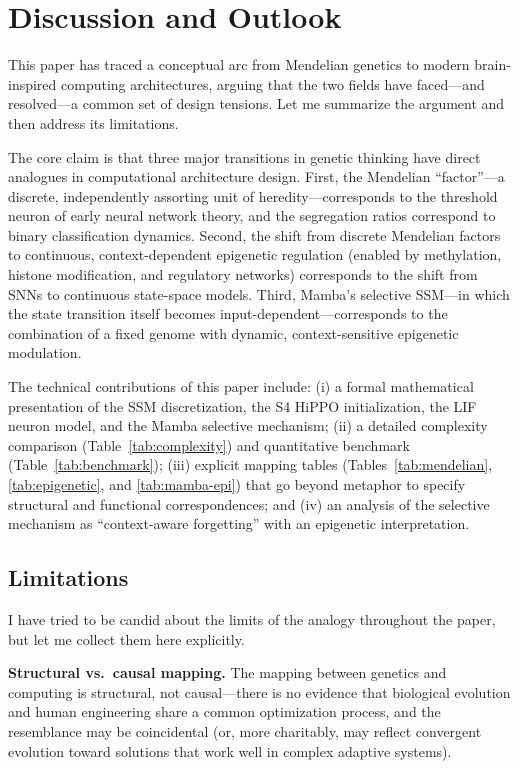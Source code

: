 \documentclass[12pt,a4paper]{article}
\begin{document}
\section{Discussion and Outlook}
\label{sec:discussion}

This paper has traced a conceptual arc from Mendelian genetics to modern brain-inspired computing architectures, arguing that the two fields have faced---and resolved---a common set of design tensions. Let me summarize the argument and then address its limitations.

The core claim is that three major transitions in genetic thinking have direct analogues in computational architecture design. First, the Mendelian ``factor''---a discrete, independently assorting unit of heredity---corresponds to the threshold neuron of early neural network theory, and the segregation ratios correspond to binary classification dynamics. Second, the shift from discrete Mendelian factors to continuous, context-dependent epigenetic regulation (enabled by methylation, histone modification, and regulatory networks) corresponds to the shift from SNNs to continuous state-space models. Third, Mamba's selective SSM---in which the state transition itself becomes input-dependent---corresponds to the combination of a fixed genome with dynamic, context-sensitive epigenetic modulation.

The technical contributions of this paper include: (i) a formal mathematical presentation of the SSM discretization, the S4 HiPPO initialization, the LIF neuron model, and the Mamba selective mechanism; (ii) a detailed complexity comparison (Table~\ref{tab:complexity}) and quantitative benchmark (Table~\ref{tab:benchmark}); (iii) explicit mapping tables (Tables~\ref{tab:mendelian}, \ref{tab:epigenetic}, and \ref{tab:mamba-epi}) that go beyond metaphor to specify structural and functional correspondences; and (iv) an analysis of the selective mechanism as ``context-aware forgetting'' with an epigenetic interpretation.

\subsection{Limitations}
\label{sec:limitations}

I have tried to be candid about the limits of the analogy throughout the paper, but let me collect them here explicitly.

\textbf{Structural vs.\ causal mapping.} The mapping between genetics and computing is structural, not causal---there is no evidence that biological evolution and human engineering share a common optimization process, and the resemblance may be coincidental (or, more charitably, may reflect convergent evolution toward solutions that work well in complex adaptive systems).
\end{document}
